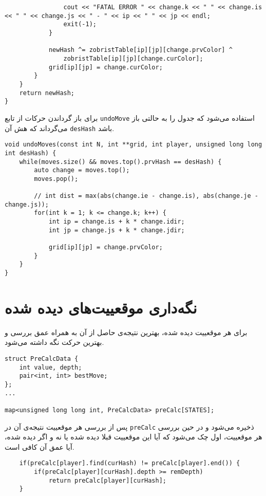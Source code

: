 \begin{latin}
\begin{lstlisting}
				cout << "FATAL ERROR " << change.k << " " << change.is << " " << change.js << " - " << ip << " " << jp << endl;
				exit(-1);
			}

			newHash ^= zobristTable[ip][jp][change.prvColor] ^ 
				zobristTable[ip][jp][change.curColor];
			grid[ip][jp] = change.curColor;
		}
	}
	return newHash;
}

\end{lstlisting}
\end{latin}

برای باز گرداندن حرکات از تابع
\verb;undoMove;
استفاده می‌شود که جدول را به حالتی باز می‌گرداند که هش آن
\verb;desHash;
باشد.

\begin{latin}
\begin{lstlisting}
void undoMoves(const int N, int **grid, int player, unsigned long long int desHash) {
	while(moves.size() && moves.top().prvHash == desHash) {
		auto change = moves.top();
		moves.pop();
		
		// int dist = max(abs(change.ie - change.is), abs(change.je - change.js));
		for(int k = 1; k <= change.k; k++) {
			int ip = change.is + k * change.idir;
			int jp = change.js + k * change.jdir;

			grid[ip][jp] = change.prvColor;
		}
	}
}
\end{lstlisting}
\end{latin}


\section{نگه‌داری موقعییت‌ها‌ی دیده شده}
برای هر موقعییت دیده شده، بهترین نتیجه‌ی حاصل از آن به همراه عمق بررسی و بهترین حرکت نگه داشته می‌شود.
\begin{latin}
\begin{lstlisting}
struct PreCalcData {
	int value, depth;
	pair<int, int> bestMove;
};
...

map<unsigned long long int, PreCalcData> preCalc[STATES];

\end{lstlisting}
\end{latin}

پس از بررسی هر موقعییت نتیجه‌ی آن در
\verb;preCalc;
ذخیره می‌شود و در حین بررسی هر موقعییت، اول چک می‌شود که آیا این موقعییت قبلا دیده شده یا نه و اگر دیده شده، آیا عمق آن کافی است.

\begin{latin}
\begin{lstlisting}
	if(preCalc[player].find(curHash) != preCalc[player].end()) {
		if(preCalc[player][curHash].depth >= remDepth)
			return preCalc[player][curHash];
	}


\end{lstlisting}
\end{latin}

